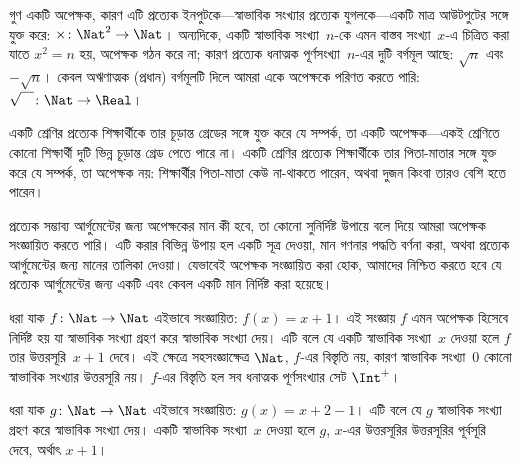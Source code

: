 \documentclass[../../../include/open-logic-section]{subfiles}
\begin{document}
\begin{ex}
গুণ একটি অপেক্ষক, কারণ এটি প্রত্যেক ইনপুটকে---স্বাভাবিক সংখ্যার প্রত্যেক যুগলকে---একটি মাত্র আউটপুটের সঙ্গে যুক্ত করে: $\times \colon \Nat^2 \to \Nat$। অন্যদিকে, একটি স্বাভাবিক সংখ্যা~$n$-কে এমন বাস্তব সংখ্যা~$x$-এ চিত্রিত করা যাতে $x^2 = n$ হয়, অপেক্ষক গঠন করে না; কারণ প্রত্যেক ধনাত্মক পূর্ণসংখ্যা~$n$-এর দুটি বর্গমূল আছে: $\sqrt{n}$ এবং~$-\sqrt{n}$। কেবল অঋণাত্মক (প্রধান) বর্গমূলটি দিলে আমরা একে অপেক্ষকে পরিণত করতে পারি: $\sqrt{\phantom{X}} \colon \Nat \to \Real$। 
\end{ex}

\begin{ex}
একটি শ্রেণির প্রত্যেক শিক্ষার্থীকে তার চূড়ান্ত গ্রেডের সঙ্গে যুক্ত করে যে সম্পর্ক, তা একটি অপেক্ষক---একই শ্রেণিতে কোনো শিক্ষার্থী দুটি ভিন্ন চূড়ান্ত গ্রেড পেতে পারে না। একটি শ্রেণির প্রত্যেক শিক্ষার্থীকে তার পিতা-মাতার সঙ্গে যুক্ত করে যে সম্পর্ক, তা অপেক্ষক নয়: শিক্ষার্থীর পিতা-মাতা কেউ না-থাকতে পারেন, অথবা দুজন কিংবা তারও বেশি হতে পারেন।
\end{ex}

\begin{explain}
প্রত্যেক সম্ভাব্য আর্গুমেন্টের জন্য অপেক্ষকের মান কী হবে, তা কোনো সুনির্দিষ্ট উপায়ে বলে দিয়ে আমরা অপেক্ষক সংজ্ঞায়িত করতে পারি। এটি করার বিভিন্ন উপায় হল একটি সূত্র দেওয়া, মান গণনার পদ্ধতি বর্ণনা করা, অথবা প্রত্যেক আর্গুমেন্টের জন্য মানের তালিকা দেওয়া। যেভাবেই অপেক্ষক সংজ্ঞায়িত করা হোক, আমাদের নিশ্চিত করতে হবে যে প্রত্যেক আর্গুমেন্টের জন্য একটি এবং কেবল একটি মান নির্দিষ্ট করা হয়েছে।
\end{explain}

\begin{ex}
ধরা যাক $f \colon \Nat \to \Nat$ এইভাবে সংজ্ঞায়িত: $f(x) = x+1$। এই সংজ্ঞায় $f$ এমন অপেক্ষক হিসেবে নির্দিষ্ট হয় যা স্বাভাবিক সংখ্যা গ্রহণ করে স্বাভাবিক সংখ্যা দেয়। এটি বলে যে একটি স্বাভাবিক সংখ্যা~$x$ দেওয়া হলে $f$ তার উত্তরসূরি~$x+1$ দেবে। এই ক্ষেত্রে সহসংজ্ঞাক্ষেত্র $\Nat$, $f$-এর বিস্তৃতি নয়, কারণ স্বাভাবিক সংখ্যা~$0$ কোনো স্বাভাবিক সংখ্যার উত্তরসূরি নয়। $f$-এর বিস্তৃতি হল সব ধনাত্মক পূর্ণসংখ্যার সেট $\Int^{+}$।
\end{ex}

\begin{ex}
ধরা যাক $g \colon \Nat \to \Nat$ এইভাবে সংজ্ঞায়িত: $g(x) = x+2-1$। এটি বলে যে $g$ স্বাভাবিক সংখ্যা গ্রহণ করে স্বাভাবিক সংখ্যা দেয়। একটি স্বাভাবিক সংখ্যা~$x$ দেওয়া হলে $g$, $x$-এর উত্তরসূরির উত্তরসূরির পূর্বসূরি দেবে, অর্থাৎ $x+1$। 
\end{ex}
\end{document}
